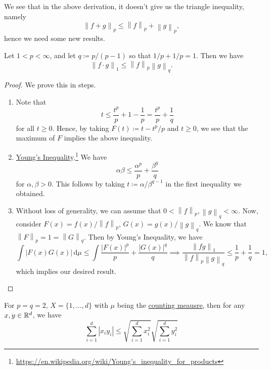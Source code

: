 We see that in the above derivation, it doesn't give us the triangle inequality, namely
\[
	\left\lVert f + g\right\rVert _p \leq  \left\lVert f\right\rVert _p + \left\lVert g\right\rVert _p,
\]
hence we need some new results.

\begin{theorem}\label{thm:Holder-inequality}
	Let \(1 < p < \infty \), and let \(q \coloneqq p / (p - 1)\) so that \(1 / p + 1 / p = 1\). Then we have
	\[
		\left\lVert f\cdot g\right\rVert _1 \leq  \left\lVert f\right\rVert _p \left\lVert g\right\rVert _q.
	\]
\end{theorem}
\begin{proof}
	We prove this in steps.
	\begin{enumerate}
		\item Note that
		      \[
			      t\leq \frac{t^p}{p}+1-\frac{1}{p} = \frac{t^p}{p}+ \frac{1}{q}
		      \]
		      for all \(t \geq 0\). Hence, by taking \(F(t) \coloneqq t - t^p / p\) and \(t \geq 0\), we see that the maximum of \(F\) implies the above inequality.
		\item \underline{Young's Inequality}.\footnote{\url{https://en.wikipedia.org/wiki/Young's_inequality_for_products}} We have
		      \[
			      \alpha \beta \leq \frac{\alpha ^p}{p} + \frac{\beta ^q}{q}
		      \]
		      for \(\alpha , \beta > 0\). This follows by taking \(t \coloneqq \alpha /\beta ^{q - 1}\) in the first inequality we obtained.
		\item Without loss of generality, we can assume that \(0 <\left\lVert f\right\rVert _p, \left\lVert g\right\rVert _q < \infty \). Now, consider \(F(x) = f(x) / \left\lVert f\right\rVert _p\),
		      \(G(x) = g(x) / \left\lVert g\right\rVert _q\). We know that \(\left\lVert F\right\rVert _p = 1 = \left\lVert G\right\rVert _q\). Then by Young's Inequality, we have
		      \[
			      \int \left\vert F(x)G(x) \right\vert \,\mathrm{d} \mu \leq \int \frac{\left\vert F(x) \right\vert ^p}{p} + \frac{\left\vert G(x) \right\vert ^q}{q} \implies \frac{\left\lVert fg\right\rVert _1}{\left\lVert f\right\rVert _p \left\lVert g\right\rVert _q}\leq \frac{1}{p} + \frac{1}{q} = 1,
		      \]
		      which implies our desired result.
	\end{enumerate}
\end{proof}
\begin{eg}
	For \(p = q = 2\), \(X = \{1, \ldots , d \}\) with \(\mu \) being the \hyperref[eg:counting-measure]{counting meausre}, then for any \(x, y\in \mathbb{\MakeUppercase{r}} ^d\), we have
	\[
		\sum\limits_{i=1}^{d} \left\vert x_{i} y_{i}  \right\vert \leq \sqrt{\sum\limits_{i=1}^{d} x_{i} ^{2} } \sqrt{\sum\limits_{i=1}^{d} y_{i} ^{2} }
	\]
\end{eg}

